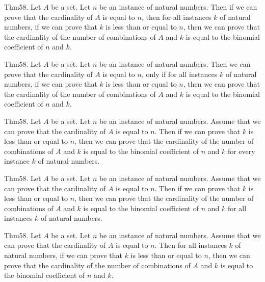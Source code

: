 \documentclass{article}
\begin{document}
Thm58. Let $A$ be a set. Let $n$ be an instance of natural numbers. Then if we can prove that the cardinality of $A$ is equal to $n$, then for all instances $k$ of natural numbers, if we can prove that $k$ is less than or equal to $n$, then we can prove that the cardinality of the number of combinations of $A$ and $k$ is equal to the binomial coefficient of $n$ and $k$.

Thm58. Let $A$ be a set. Let $n$ be an instance of natural numbers. Then we can prove that the cardinality of $A$ is equal to $n$, only if for all instances $k$ of natural numbers, if we can prove that $k$ is less than or equal to $n$, then we can prove that the cardinality of the number of combinations of $A$ and $k$ is equal to the binomial coefficient of $n$ and $k$.

Thm58. Let $A$ be a set. Let $n$ be an instance of natural numbers. Assume that we can prove that the cardinality of $A$ is equal to $n$. Then if we can prove that $k$ is less than or equal to $n$, then we can prove that the cardinality of the number of combinations of $A$ and $k$ is equal to the binomial coefficient of $n$ and $k$ for every instance $k$ of natural numbers.

Thm58. Let $A$ be a set. Let $n$ be an instance of natural numbers. Assume that we can prove that the cardinality of $A$ is equal to $n$. Then if we can prove that $k$ is less than or equal to $n$, then we can prove that the cardinality of the number of combinations of $A$ and $k$ is equal to the binomial coefficient of $n$ and $k$ for all instances $k$ of natural numbers.

Thm58. Let $A$ be a set. Let $n$ be an instance of natural numbers. Assume that we can prove that the cardinality of $A$ is equal to $n$. Then for all instances $k$ of natural numbers, if we can prove that $k$ is less than or equal to $n$, then we can prove that the cardinality of the number of combinations of $A$ and $k$ is equal to the binomial coefficient of $n$ and $k$.
\end{document}
